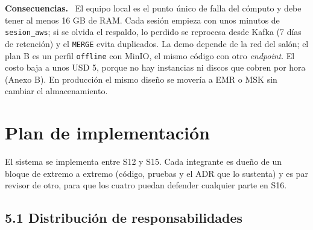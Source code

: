 \documentclass[12pt,letterpaper]{article}
\newcommand{\code}[1]{{\small\texttt{#1}}}
\newcommand{\adrpart}[1]{\textbf{#1.}~}
\begin{document}
\adrpart{Consecuencias} El equipo local es el punto único de falla del cómputo y debe tener al menos 16 GB de RAM. Cada sesión empieza con unos minutos de \code{sesion\_aws}; si se olvida el respaldo, lo perdido se reprocesa desde Kafka (7 días de retención) y el \code{MERGE} evita duplicados. La demo depende de la red del salón; el plan B es un perfil \code{offline} con MinIO, el mismo código con otro \emph{endpoint}. El costo baja a unos USD 5, porque no hay instancias ni discos que cobren por hora (Anexo B). En producción el mismo diseño se movería a EMR o MSK sin cambiar el almacenamiento.

\section{Plan de implementación}

El sistema se implementa entre S12 y S15. Cada integrante es dueño de un bloque de extremo a extremo (código, pruebas y el ADR que lo sustenta) y es par revisor de otro, para que los cuatro puedan defender cualquier parte en S16.

\subsection*{5.1 Distribución de responsabilidades}
\end{document}

